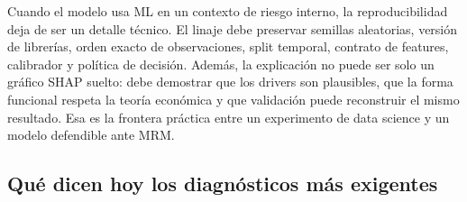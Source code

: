 \documentclass[
  spanish,
  11pt,
  letterpaper,
]{scrbook}
\theoremstyle{plain}
\theoremstyle{remark}
\begin{document}
\begin{tcolorbox}[enhanced jigsaw, arc=.35mm, bottomrule=.15mm, bottomtitle=1mm, breakable, colback=white, colbacktitle=quarto-callout-tip-color!10!white, colframe=quarto-callout-tip-color-frame, coltitle=black, left=2mm, leftrule=.75mm, opacityback=0, opacitybacktitle=0.6, rightrule=.15mm, title=\textcolor{quarto-callout-tip-color}{\faLightbulb}\hspace{0.5em}{Controles mínimos para ML regulado}, titlerule=0mm, toprule=.15mm, toptitle=1mm]

Cuando el modelo usa ML en un contexto de riesgo interno, la
reproducibilidad deja de ser un detalle técnico. El linaje debe
preservar semillas aleatorias, versión de librerías, orden exacto de
observaciones, split temporal, contrato de features, calibrador y
política de decisión. Además, la explicación no puede ser solo un
gráfico SHAP suelto: debe demostrar que los drivers son plausibles, que
la forma funcional respeta la teoría económica y que validación puede
reconstruir el mismo resultado. Esa es la frontera práctica entre un
experimento de data science y un modelo defendible ante MRM.

\end{tcolorbox}

\subsection{Qué dicen hoy los diagnósticos más
exigentes}\label{quuxe9-dicen-hoy-los-diagnuxf3sticos-muxe1s-exigentes}
\end{document}
